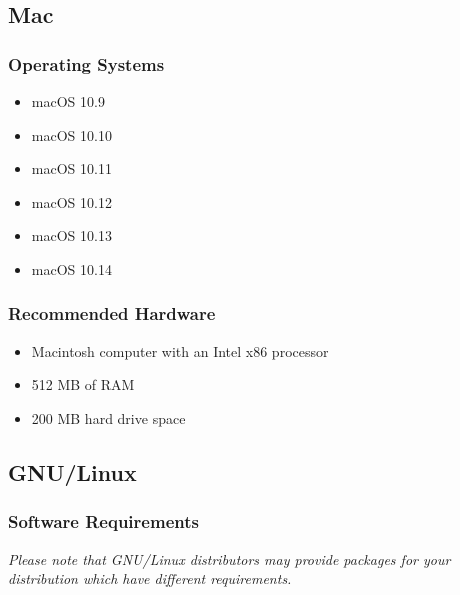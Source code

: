 \documentclass{article}
\begin{document}
\subsection*{Mac}\label{mac}

\subsubsection*{Operating Systems}\label{operating-systems}

\begin{itemize}
\item macOS 10.9
\item macOS 10.10
\item macOS 10.11
\item macOS 10.12
\item macOS 10.13
\item macOS 10.14
\end{itemize}

\subsubsection*{Recommended Hardware}\label{recommended-hardware_1}

\begin{itemize}
\item Macintosh computer with an Intel x86 processor
\item 512 MB of RAM
\item 200 MB hard drive space
\end{itemize}

\subsection*{GNU/Linux}\label{gnulinux}

\subsubsection*{Software Requirements}\label{software-requirements}

\emph{Please note that GNU/Linux distributors may provide packages for your
  distribution which have different requirements.}
\end{document}
